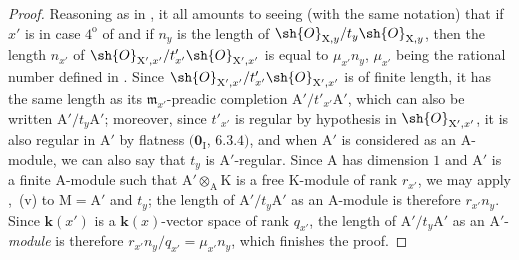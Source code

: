 \begin{proof}
Reasoning as in , it all amounts to seeing (with the same notation) that if $x'$ is in case $4^{\mathrm{o}}$ of  and if $n_y$ is the length of $\sh{O}_{\mathrm{X},y}/t_y\sh{O}_{\mathrm{X},y}$, then the
length $n_{x'}$ of $\sh{O}_{\mathrm{X}',x'}/t'_{x'}\sh{O}_{\mathrm{X}',x'}$ is equal to $\mu_{x'}n_y$, $\mu_{x'}$ being the rational number defined in .
Since $\sh{O}_{\mathrm{X}',x'}/t'_{x'}\sh{O}_{\mathrm{X}',x'}$ is of finite length, it has the same length as its $\mathfrak{m}_{x'}$-preadic completion $\mathrm{A}'/t'_{x'}\mathrm{A}'$, which can also be written $\mathrm{A}'/t_y\mathrm{A}'$; moreover, since $t'_{x'}$ is regular by hypothesis in $\sh{O}_{\mathrm{X}',x'}$, it is also regular in $\mathrm{A}'$ by flatness $(\mathbf{0}_{\mathrm{I}}$, $6.3.4)$, and when $\mathrm{A}'$ is considered as an A-module, we can also say that $t_y$ is $\mathrm{A}'$-regular.
Since $\mathrm{A}$ has dimension $1$ and $\mathrm{A}'$ is a finite $\mathrm{A}$-module such that $\mathrm{A}'\otimes_{\mathrm{A}}\mathrm{K}$ is a free $\mathrm{K}$-module of rank $r_{x'}$, we may apply ,{}~(v) to $\mathrm{M}=\mathrm{A}'$ and $t_y$; the length of $\mathrm{A}'/t_y\mathrm{A}'$ as an $\mathrm{A}$-module is therefore $r_{x'}n_y$.
Since $\boldsymbol{k}(x')$ is a $\boldsymbol{k}(x)$-vector space of rank $q_{x'}$, the length of $\mathrm{A}'/t_y\mathrm{A}'$ as an $\mathrm{A}'$-\emph{module} is therefore $r_{x'}n_y/q_{x'}=\mu_{x'}n_y$, which finishes the proof.
\end{proof}

